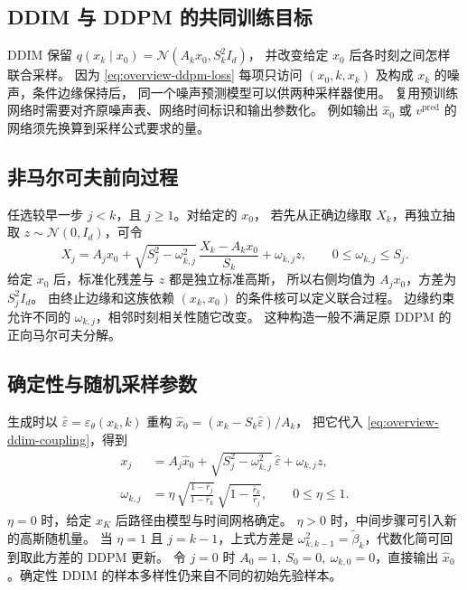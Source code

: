 \subsection{DDIM 与 DDPM 的共同训练目标}

DDIM \cite{song2021ddim} 保留 \(q(x_k\mid x_0)=\mathcal N(A_kx_0,S_k^2I_d)\)，
并改变给定 \(x_0\) 后各时刻之间怎样联合采样。
因为 \eqref{eq:overview-ddpm-loss} 每项只访问
\((x_0,k,x_k)\) 及构成 \(x_k\) 的噪声，条件边缘保持后，
同一个噪声预测模型可以供两种采样器使用。
复用预训练网络时需要对齐原噪声表、网络时间标识和输出参数化。
例如输出 \(\widehat x_0\) 或 \(v^{\mathrm{pred}}\) 的网络须先换算到采样公式要求的量。

\subsection{非马尔可夫前向过程}

任选较早一步 \(j<k\)，且 \(j\ge1\)。对给定的 \(x_0\)，
若先从正确边缘取 \(X_k\)，再独立抽取 \(z\sim\mathcal N(0,I_d)\)，可令
\begin{equation}
  X_j=A_jx_0+\sqrt{S_j^2-\omega_{k,j}^2}\,
                    \frac{X_k-A_kx_0}{S_k}
            +\omega_{k,j} z,\qquad 0\le\omega_{k,j}\le S_j .
  \label{eq:overview-ddim-coupling}
\end{equation}
给定 \(x_0\) 后，标准化残差与 \(z\) 都是独立标准高斯，
所以右侧均值为 \(A_jx_0\)，方差为 \(S_j^2I_d\)。
由终止边缘和这族依赖 \((x_k,x_0)\) 的条件核可以定义联合过程。
边缘约束允许不同的 \(\omega_{k,j}\)，相邻时刻相关性随它改变。
这种构造一般不满足原 DDPM 的正向马尔可夫分解。

\subsection{确定性与随机采样参数}

生成时以 \(\widehat\varepsilon=\varepsilon_\theta(x_k,k)\) 重构
\(\widehat x_0=(x_k-S_k\widehat\varepsilon)/A_k\)，
把它代入 \eqref{eq:overview-ddim-coupling}，得到
\begin{equation}
  \begin{aligned}
  x_j &= A_j\widehat x_0
          +\sqrt{S_j^2-\omega_{k,j}^2}\,\widehat\varepsilon
          +\omega_{k,j}z,\\
  \omega_{k,j} &=
     \eta\,\sqrt{\frac{1-\bar r_j}{1-\bar r_k}}\,
                   \sqrt{1-\frac{\bar r_k}{\bar r_j}},\qquad 0\le\eta\le1 .
  \end{aligned}
  \label{eq:overview-ddim-update}
\end{equation}
\(\eta=0\) 时，给定 \(x_K\) 后路径由模型与时间网格确定。
\(\eta>0\) 时，中间步骤可引入新的高斯随机量。
当 \(\eta=1\) 且 \(j=k-1\)，上式方差是
\(\omega_{k,k-1}^2=\widetilde\beta_k\)，代数化简可回到取此方差的 DDPM 更新。
令 \(j=0\) 时 \(A_0=1,\ S_0=0,\ \omega_{k,0}=0\)，直接输出
\(\widehat x_0\)。确定性 DDIM 的样本多样性仍来自不同的初始先验样本。

